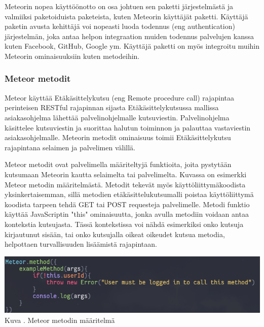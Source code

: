 Meteorin nopea käyttöönotto on osa johtuen sen paketti järjestelmästä ja valmiiksi paketoiduista paketeista, kuten Meteorin käyttäjät paketti. 
Käyttäjä paketin avusta kehittäjä voi nopeasti luoda todennus (eng authentication) järjestelmän,
joka antaa helpon integraation muiden todennus palvelujen kanssa kuten Facebook, GitHub, Google ym.
Käyttäjä paketti on myös integroitu muihin Meteorin ominaisuuksiin kuten metodeihin.



\subsubsection{Meteor metodit}




Meteor käyttää Etäkäsittelykutsu (eng Remote procedure call) rajapintaa perinteisen RESTful rajapinnan sijasta
Etäkäsittelykutsussa mallissa asiakasohjelma lähettää palvelinohjelmalle kutsuviestin.
Palvelinohjelma käsittelee kutsuviestin ja suorittaa halutun toiminnon ja palauttaa vastaviestin asiakasohjelmalle.
Meteorin metodit ominaisuus toimii Etäkäsittelykutsu rajapintana selaimen ja palvelimen välillä. 
\medskip



Meteor metodit ovat palvelimella määriteltyjä funktioita, joita pystytään kutsumaan Meteorin kautta selaimelta tai palvelimelta. 
Kuvassa \nextImageCount{} on esimerkki Meteor metodin määritelmästä.
Metodit tekevät myös käyttöliittymäkoodista yksinkertaisemman, 
sillä metodien etäkäsittelukutsumalli poistaa käyttöliittymä koodista tarpeen tehdä GET tai POST requesteja palvelimelle.
Metodi funktio käyttää JavaScriptin "this"{} ominaisuutta, jonka
avulla metodiin voidaan antaa kontekstia kutsujasta.
Tässä kontekstissa voi nähdä esimerkiksi onko kutsuja kirjautunut sisään, tai onko kutsujalla oikeat oikeudet kutsua metodia, 
helpottaen turvallisuuden lisäämistä rajapintaan.
\bigskip

\includegraphics[width=15cm]{src/public/methodexample.png}\\
Kuva \getImgCount {}. Meteor metodin määritelmä
\medskip

